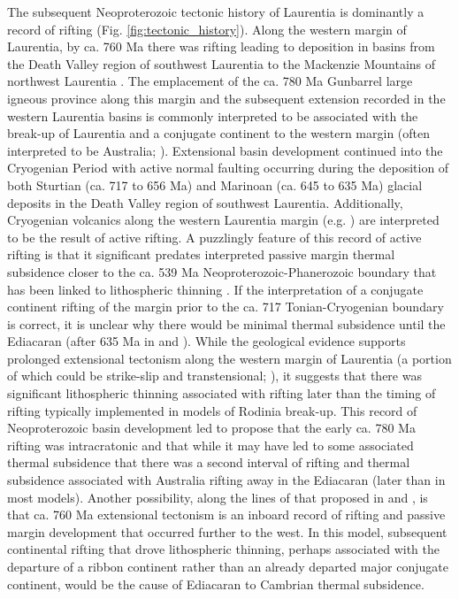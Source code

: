 \documentclass[twocolumn, switch]{article} %
\begin{document}
The subsequent Neoproterozoic tectonic history of Laurentia is dominantly a record of rifting (Fig. \ref{fig:tectonic_history}). Along the western margin of Laurentia, by ca. 760 Ma there was rifting leading to deposition in basins from the Death Valley region of southwest Laurentia to the Mackenzie Mountains of northwest Laurentia \citep{Macdonald2013a, Dehler2017a, Rooney2017a}. The emplacement of the ca. 780 Ma Gunbarrel large igneous province \citep{Harlan2003a} along this margin and the subsequent extension recorded in the western Laurentia basins is commonly interpreted to be associated with the break-up of Laurentia and a conjugate continent to the western margin (often interpreted to be Australia; \citealp{Li2008a}). Extensional basin development continued into the Cryogenian Period with active normal faulting occurring during the deposition of both Sturtian (ca. 717 to 656 Ma) and Marinoan (ca. 645 to 635 Ma) glacial deposits in the Death Valley region of southwest Laurentia\citep{Nelson2020a}. Additionally, Cryogenian volcanics along the western Laurentia margin (e.g. \citealp{Eyster2018a}) are interpreted to be the result of active rifting.  A puzzlingly feature of this record of active rifting is that it significant predates interpreted passive margin thermal subsidence closer to the ca. 539 Ma Neoproterozoic-Phanerozoic boundary that has been linked to lithospheric thinning \citep{Bond1984a, Levy1991a}. If the interpretation of a conjugate continent rifting of the margin prior to the ca. 717 Tonian-Cryogenian boundary is correct, it is unclear why there would be minimal thermal subsidence until the Ediacaran (after 635 Ma in \citealp{Levy1991a} and \citealp{Witkosky2018a}). While the geological evidence supports prolonged extensional tectonism along the western margin of Laurentia (a portion of which could be strike-slip and transtensional; \citealp{Smith2015b}), it suggests that there was significant lithospheric thinning associated with rifting later than the timing of rifting typically implemented in models of Rodinia break-up. This record of Neoproterozoic basin development led \cite{Yonkee2014a} to propose that the early ca. 780 Ma rifting was intracratonic and that while it may have led to some associated thermal subsidence that there was a second interval of rifting and thermal subsidence associated with Australia rifting away in the Ediacaran (later than in most models). Another possibility, along the lines of that proposed in \citet{Ross1991a} and \citet{Colpron2002a}, is that ca. 760 Ma extensional tectonism is an inboard record of rifting and passive margin development that occurred further to the west. In this model, subsequent continental rifting that drove lithospheric thinning, perhaps associated with the departure of a ribbon continent rather than an already departed major conjugate continent, would be the cause of Ediacaran to Cambrian thermal subsidence.
\end{document}
